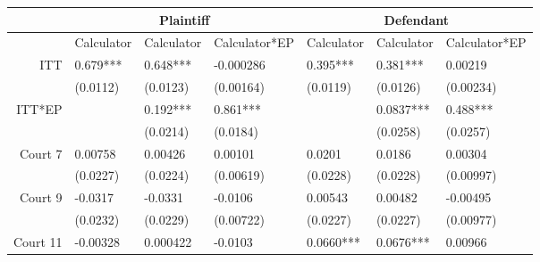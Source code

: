 \begin{tabular}{rrrrrrr}
\toprule
      & \multicolumn{3}{c}{Plaintiff} & \multicolumn{3}{c}{Defendant} \\
\midrule
      & \multicolumn{1}{c}{Calculator} & \multicolumn{1}{c}{Calculator} & \multicolumn{1}{c}{Calculator*EP} & \multicolumn{1}{c}{Calculator} & \multicolumn{1}{c}{Calculator} & \multicolumn{1}{c}{Calculator*EP} \\
      \midrule
      \midrule
ITT   & \multicolumn{1}{l}{0.679***} & \multicolumn{1}{l}{0.648***} & \multicolumn{1}{l}{-0.000286} & \multicolumn{1}{l}{0.395***} & \multicolumn{1}{l}{0.381***} & \multicolumn{1}{l}{0.00219} \\
      & \multicolumn{1}{l}{(0.0112)} & \multicolumn{1}{l}{(0.0123)} & \multicolumn{1}{l}{(0.00164)} & \multicolumn{1}{l}{(0.0119)} & \multicolumn{1}{l}{(0.0126)} & \multicolumn{1}{l}{(0.00234)} \\
ITT*EP & \multicolumn{1}{l}{} & \multicolumn{1}{l}{0.192***} & \multicolumn{1}{l}{0.861***} & \multicolumn{1}{l}{} & \multicolumn{1}{l}{0.0837***} & \multicolumn{1}{l}{0.488***} \\
      & \multicolumn{1}{l}{} & \multicolumn{1}{l}{(0.0214)} & \multicolumn{1}{l}{(0.0184)} & \multicolumn{1}{l}{} & \multicolumn{1}{l}{(0.0258)} & \multicolumn{1}{l}{(0.0257)} \\
Court 7 & \multicolumn{1}{l}{0.00758} & \multicolumn{1}{l}{0.00426} & \multicolumn{1}{l}{0.00101} & \multicolumn{1}{l}{0.0201} & \multicolumn{1}{l}{0.0186} & \multicolumn{1}{l}{0.00304} \\
      & \multicolumn{1}{l}{(0.0227)} & \multicolumn{1}{l}{(0.0224)} & \multicolumn{1}{l}{(0.00619)} & \multicolumn{1}{l}{(0.0228)} & \multicolumn{1}{l}{(0.0228)} & \multicolumn{1}{l}{(0.00997)} \\
Court 9 & \multicolumn{1}{l}{-0.0317} & \multicolumn{1}{l}{-0.0331} & \multicolumn{1}{l}{-0.0106} & \multicolumn{1}{l}{0.00543} & \multicolumn{1}{l}{0.00482} & \multicolumn{1}{l}{-0.00495} \\
      & \multicolumn{1}{l}{(0.0232)} & \multicolumn{1}{l}{(0.0229)} & \multicolumn{1}{l}{(0.00722)} & \multicolumn{1}{l}{(0.0227)} & \multicolumn{1}{l}{(0.0227)} & \multicolumn{1}{l}{(0.00977)} \\
Court 11 & \multicolumn{1}{l}{-0.00328} & \multicolumn{1}{l}{0.000422} & \multicolumn{1}{l}{-0.0103} & \multicolumn{1}{l}{0.0660***} & \multicolumn{1}{l}{0.0676***} & \multicolumn{1}{l}{0.00966} \\

\end{tabular}
